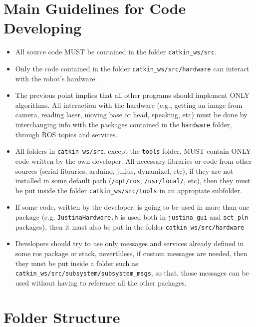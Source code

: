 \documentclass[letterpaper,10pt]{article}
\begin{document}
\section{Main Guidelines for Code Developing}
\begin{itemize}
\item All source code MUST be contained in the folder \texttt{catkin\_ws/src}.
\item Only the code contained in the folder \texttt{catkin\_ws/src/hardware} can interact with the robot's hardware.
\item The previous point implies that all other programs should implement ONLY algorithms. All interaction with the hardware (e.g., getting an image from camera, reading laser, moving base or head, speaking, etc) must be done by interchanging info with the packages contained in the \texttt{hardware} folder, through ROS topics and services. 
\item All folders in \texttt{catkin\_ws/src}, except the \texttt{tools} folder, MUST contain ONLY code written by the own developer. All necessary libraries or code from other sources (serial libraries, arduino, julius, dynamixel, etc), if they are not installed in some default path (\texttt{/opt/ros}, \texttt{/usr/local/}, etc), then they must be put inside the folder  \texttt{catkin\_ws/src/tools} in an appropiate subfolder.
\item If some code, written by the developer, is going to be used in more than one package (e.g. \texttt{JustinaHardware.h} is used both in \texttt{justina_gui} and \texttt{act_pln} packages), then it must also be put in the folder \texttt{catkin\_ws/src/hardware}
\item Developers should try to use only messages and services already defined in some ros package or stack, neverthless, if custom messages are needed, then they must be put inside a folder such as \texttt{catkin\_ws/src/subsystem/subsystem\_msgs}, so that, those messages can be used without having to reference all the other packages. 
\end{itemize}

\section{Folder Structure}
\end{document}
